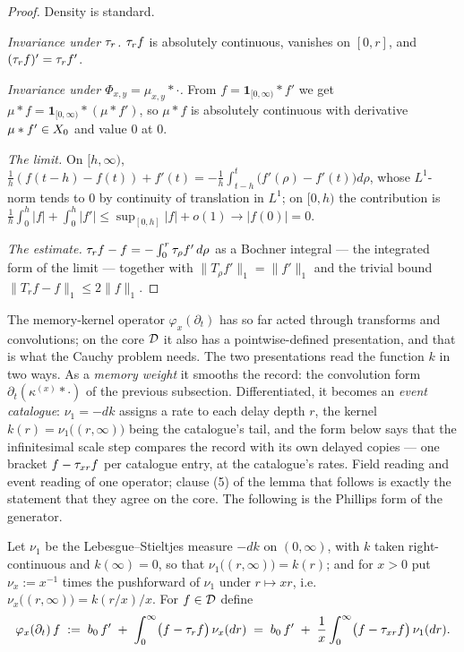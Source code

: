 \begin{proof}
Density is standard.

\emph{Invariance under $\tau_r$.} $\tau_r f$ is absolutely continuous, vanishes on $[0, r]$, and
$(\tau_r f)' = \tau_r f'$.

\emph{Invariance under $\Phi_{x,y} = \mu_{x,y} * \cdot$.} From
$f = \mathbf{1}_{[0,\infty)} * f'$ we get $\mu * f = \mathbf{1}_{[0,\infty)} * (\mu * f')$,
so $\mu * f$ is absolutely continuous with derivative $\mu * f' \in X_0$ and value $0$ at
$0$.

\emph{The limit.} On $[h, \infty)$,
$\tfrac{1}{h}(f(t-h) - f(t)) + f'(t) = -\tfrac{1}{h}\int_{t-h}^{t}\bigl(f'(\rho) - f'(t)\bigr)d\rho$,
whose $L^1$-norm tends to $0$ by continuity of translation in $L^1$; on $[0, h)$ the
contribution is
$\tfrac{1}{h}\int_0^h |f| + \int_0^h |f'| \le \sup_{[0,h]}|f| + o(1) \to |f(0)| = 0$.

\emph{The estimate.} $\tau_r f - f = -\int_0^r \tau_\rho f'\,d\rho$ as a Bochner integral --- the
integrated form of the limit --- together with $\|T_\rho f'\|_1 = \|f'\|_1$ and the trivial
bound $\|T_rf - f\|_1 \le 2\|f\|_1$.
\end{proof}

The memory-kernel operator $\varphi_x(\partial_t)$ has so far acted through transforms and
convolutions; on the core $\mathcal{D}$ it also has a pointwise-defined presentation, and that is
what the Cauchy problem needs. The two presentations read the function $k$ in two ways. As
a \emph{memory weight} it smooths the record: the convolution form
$\partial_t(\kappa^{(x)} * \cdot)$ of the previous subsection. Differentiated, it becomes
an \emph{event catalogue}: $\nu_1 = -dk$ assigns a rate to each delay depth $r$, the
kernel $k(r) = \nu_1\bigl((r,\infty)\bigr)$ being the catalogue's tail, and the form below
says that the infinitesimal scale step compares the record with its own delayed copies ---
one bracket $f - \tau_{xr} f$ per catalogue entry, at the catalogue's rates. Field
reading and event reading of one operator; clause (5) of the lemma that follows is exactly
the statement that they agree on the core. The following is the Phillips form of the
generator.

\begin{definition}\label{def:phillips-generator}
Let $\nu_1$ be the Lebesgue--Stieltjes measure $-dk$ on $(0,\infty)$, with $k$ taken
right-continuous and $k(\infty) = 0$, so that $\nu_1\bigl((r,\infty)\bigr) = k(r)$; and for
$x > 0$ put $\nu_x := x^{-1}$ times the pushforward of $\nu_1$ under $r \mapsto xr$, i.e.\
$\nu_x\bigl((r,\infty)\bigr) = k(r/x)/x$. For $f \in \mathcal{D}$ define
\[
  \varphi_x(\partial_t)\, f \;:=\; b_0\, f' \;+\; \int_0^\infty \bigl(f - \tau_r f\bigr)\,\nu_x(dr)
  \;=\; b_0\, f' \;+\; \frac{1}{x}\int_0^\infty \bigl(f - \tau_{xr} f\bigr)\,\nu_1(dr).
\]
\end{definition}

